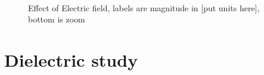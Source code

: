 \begin{figure}%
    \centering
    \\
    \caption{Effect of Electric field, labels are magnitude in [put units here], bottom is zoom}
    \label{fig:efield effect}
 \end{figure}

 \section{Dielectric study}

